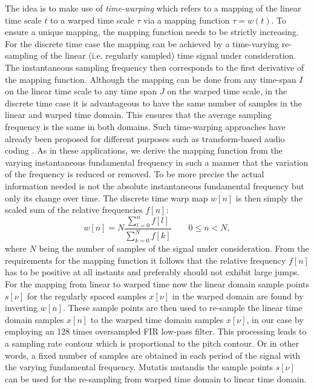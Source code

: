 The idea is to make use of \emph{time-warping} which refers to a mapping of the linear time scale $t$ to a warped time scale $\tau$ via a mapping function $\tau=w(t)$.
To ensure a unique mapping, the mapping function needs to be strictly increasing.
For the discrete time case the mapping can be achieved by a time-varying re-sampling of the linear (i.e. regularly sampled) time signal under consideration.
The instantaneous sampling frequency then corresponds to the first derivative of
the mapping function. Although the mapping can be done from any time-span
$I$ on the linear time scale to any time span $J$ on the warped time scale, in
the discrete time case it is advantageous to have the same number of samples
in the linear and warped time domain. This ensures that the average sampling
frequency is the same in both domains. Such time-warping approaches have already
been proposed for different purposes such as transform-based audio coding
\cite{edler09}. As in these applications, we derive the mapping function from
the varying instantaneous fundamental frequency in such a manner that the variation of the frequency is
reduced or removed. To be more precise the actual information needed is not
the absolute instantaneous fundamental frequency but only its change over time.
The discrete time warp map $w[n]$ is then simply the scaled sum of the relative
frequencies $f[n]$:
\begin{equation}
w[n]=N \frac{\sum^n_{l=0}{f[l]}}{\sum^N_{k=0}{f[k]}}  \qquad 0\leq n<N,
\end{equation}
where $N$ being the number of samples of the signal under consideration.
From the requirements for the mapping function it follows that the relative
frequency $f[n]$ has to be positive at all instants and preferably should not
exhibit large jumps.
For the mapping from linear to warped time now the linear domain sample points
$s[\nu]$ for the regularly spaced samples $x[\nu]$ in the warped domain are
found by inverting $w[n]$. These sample points are then used to re-sample the linear time
domain samples $x[n]$ to the warped time domain samples $x[\nu]$, in our case
by employing an 128 times oversampled FIR low-pass filter. This processing leads to a sampling rate contour which is proportional to the pitch contour. Or in other words, a fixed number of samples are obtained in each period of the signal with the varying fundamental frequency. Mutatis mutandis the sample points $s[\nu]$ can be used for the re-sampling from warped time domain to linear time domain. \\

